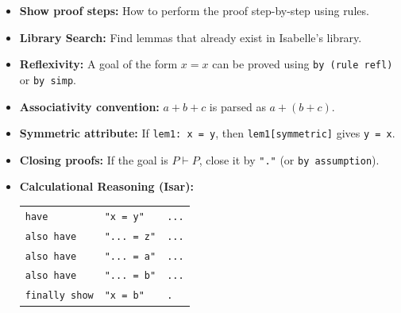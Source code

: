\documentclass[10pt,a4paper]{article}
\begin{document}
\begin{tcolorbox}[title=Isabelle Practical Notes]
\begin{itemize}[leftmargin=1.2em, itemsep=3pt]
    \item \textbf{Show proof steps:} How to perform the proof step-by-step using rules.
    \item \textbf{Library Search:} Find lemmas that already exist in Isabelle's library.
    \item \textbf{Reflexivity:} A goal of the form $x = x$ can be proved using \texttt{by (rule refl)} or \texttt{by simp}.
    \item \textbf{Associativity convention:} $a + b + c$ is parsed as $a + (b + c)$.
    \item \textbf{Symmetric attribute:} If \texttt{lem1: x = y}, then \texttt{lem1[symmetric]} gives \texttt{y = x}.
    \item \textbf{Closing proofs:} If the goal is $P \vdash P$, close it by \texttt{"."} (or \texttt{by assumption}).
    \item \textbf{Calculational Reasoning (Isar):}
    \begin{center}
    \begin{tabular}{lll}
    \texttt{have} & \texttt{"x = y"} & \texttt{...} \\
    \texttt{also have} & \texttt{"... = z"} & \texttt{...} \\
    \texttt{also have} & \texttt{"... = a"} & \texttt{...} \\
    \texttt{also have} & \texttt{"... = b"} & \texttt{...} \\
    \texttt{finally show} & \texttt{"x = b"} & \texttt{.}
    \end{tabular}
    \end{center}
\end{itemize}
\end{tcolorbox}
\end{document}
